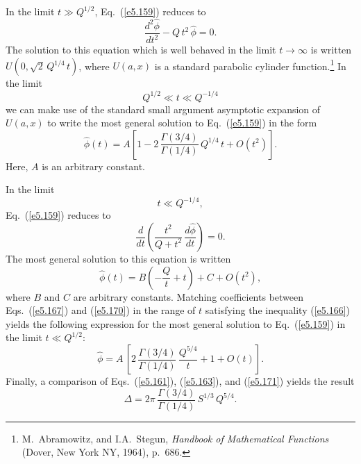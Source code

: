 In the limit $t\gg Q^{1/2}$, Eq.~(\ref{e5.159})
reduces to
\begin{equation}\label{e5.165}
\frac{d^2\hat{\phi}}{d t^2} - Q\,t^2\,\hat{\phi} = 0.
\end{equation}
The solution to this equation which is well behaved in the limit
$t\rightarrow \infty$ is written $U(0,\sqrt{2}\,Q^{1/4}\,t)$, where
$U(a,x)$ is a standard parabolic cylinder function.\footnote{M.~Abramowitz, and I.A.~Stegun, {\em Handbook of Mathematical Functions} (Dover, New York NY, 1964),
 p.~686.}  In the limit
\begin{equation}\label{e5.166}
Q^{1/2} \ll t \ll Q^{-1/4}
\end{equation}
we can make use of the standard small argument asymptotic expansion
of $U(a,x)$ to write the most general solution to Eq.~(\ref{e5.159}) in the
form
\begin{equation}\label{e5.167}
\hat{\phi}(t) = A\left[ 1-  2 \,\frac{{\Gamma}(3/4)}{{\Gamma}(1/4)}
\, Q^{1/4}\,t + O(t^2)\right].
\end{equation} 
Here, $A$ is an arbitrary constant.

In the limit
\begin{equation}
t \ll Q^{-1/4},
\end{equation}
Eq.~(\ref{e5.159}) reduces to
\begin{equation}
\frac{d}{dt}\!\left(\frac{t^2}{Q+t^2}\,\frac{d\hat{\phi}}{dt} \right) = 0.
\end{equation}
The most general solution to this equation is written
\begin{equation}\label{e5.170}
\hat{\phi}(t) = B\!\left(-\frac{Q}{t} + t\right) + C +O(t^2),
\end{equation}
where $B$ and $C$ are arbitrary constants. 
Matching coefficients between Eqs.~(\ref{e5.167}) and (\ref{e5.170}) in the range of $t$
satisfying the inequality (\ref{e5.166}) yields the following expression
for the most general solution to Eq.~(\ref{e5.159}) in the limit  $t\ll Q^{1/2}$:
\begin{equation}\label{e5.171}
\hat{\phi} = A\,\left[ 2\,\frac{{\Gamma}(3/4)}{{\Gamma}(1/4)}
\, \frac{Q^{5/4}}{t} + 1 + O(t)\right].
\end{equation}
Finally, a comparison of Eqs.~(\ref{e5.161}), (\ref{e5.163}), and (\ref{e5.171})
yields the result
\begin{equation}\label{e5.172}
{\Delta} = 2\pi\,\frac{{\Gamma}(3/4)}{{\Gamma}(1/4)}\,S^{1/3}\,
Q^{5/4}.
\end{equation}

